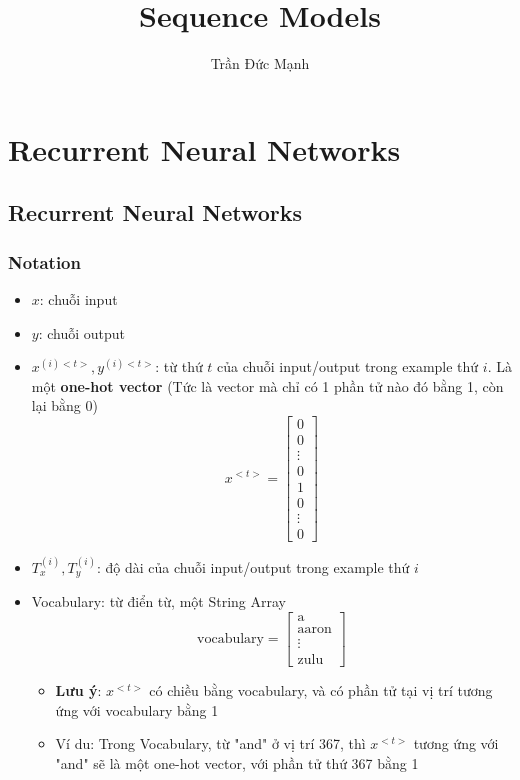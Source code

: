 \documentclass[12pt,a4paper]{report}
\author{Trần Đức Mạnh}
\title{Sequence Models}
\begin{document}
\maketitle
\tableofcontents

\chapter{Recurrent Neural Networks}
	\section{Recurrent Neural Networks}
		\subsection{Notation}
			\begin{itemize}
				\item $x$: chuỗi input
				\item $y$: chuỗi output
				\item $x^{(i)<t>}, y^{(i)<t>}$: từ thứ $t$ của chuỗi input/output trong example thứ $i$. Là một \textbf{one-hot vector} (Tức là vector mà chỉ có 1 phần tử nào đó bằng 1, còn lại bằng 0)
					\begin{equation}
						x^{<t>} = 
						\begin{bmatrix}
							0\\
							0\\
							\vdots\\
							0\\
							1\\
							0\\
							\vdots\\
							0						
						\end{bmatrix}
					\end{equation}
				\item $T_{x}^{(i)}, T_{y}^{(i)}$: độ dài của chuỗi input/output trong example thứ $i$
				\item Vocabulary: từ điển từ, một String Array
					\begin{equation}
						\text{vocabulary} = 
						\begin{bmatrix}
							\text{a}\\
							\text{aaron}\\
							\vdots\\
							\text{zulu}						
						\end{bmatrix}
					\end{equation}
				\begin{itemize}
					\item \textbf{Lưu ý}: $x^{<t>}$ có chiều bằng vocabulary, và có phần tử tại vị trí tương ứng với vocabulary bằng 1
					\item Ví du: Trong Vocabulary, từ "and" ở vị trí 367, thì $x^{<t>}$ tương ứng với "and" sẽ là một one-hot vector, với phần tử thứ 367 bằng 1	
				\end{itemize}
			\end{itemize}
\end{document}
